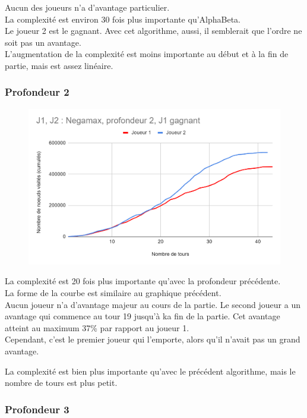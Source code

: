 \documentclass[12pt]{article}
\begin{document}
Aucun des joueurs n’a d’avantage particulier.\\
La complexité est environ 30 fois plus importante qu’AlphaBeta.\\
Le joueur 2 est le gagnant. Avec cet algorithme, aussi, il semblerait que l'ordre ne soit pas un avantage.\\
L’augmentation de la complexité est moins importante au début et à la fin de partie, mais est assez linéaire.

\newpage
\subsubsection{Profondeur 2}

\begin{figure}[!h]
   \includegraphics[width=\textwidth]{prof2negamax.png}
\end{figure}

La complexité est 20 fois plus importante qu’avec la profondeur précédente.\\
La forme de la courbe est similaire au graphique précédent.\\
Aucun joueur n’a d’avantage majeur au cours de la partie. Le second joueur a un avantage qui commence au tour 19 jusqu'à ka fin de la partie. Cet avantage atteint au maximum 37\% par rapport au joueur 1. \\
Cependant, c’est le premier joueur qui l’emporte, alors qu’il n’avait pas un grand avantage.

La complexité est bien plus importante qu'avec le précédent algorithme, mais le nombre de tours est plus petit.

\newpage
\subsubsection{Profondeur 3}
\end{document}
